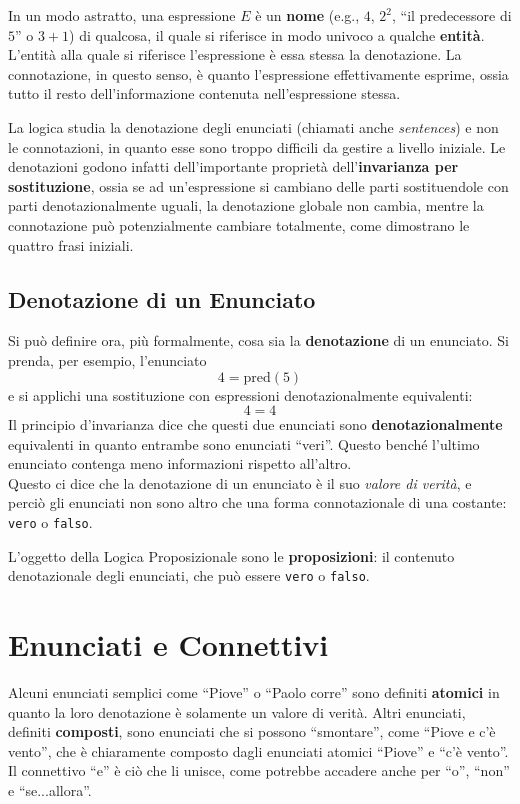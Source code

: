 In un modo astratto, una espressione $E$ è un \textbf{nome} (e.g., $4$, $2^2$, ``il predecessore di $5$'' o $3+1$) di qualcosa, il quale si riferisce in modo univoco a qualche \textbf{entità}. L'entità alla quale si riferisce l'espressione è essa stessa la denotazione. La connotazione, in questo senso, è quanto l'espressione effettivamente esprime, ossia tutto il resto dell'informazione contenuta nell'espressione stessa. 

La logica studia la denotazione degli enunciati (chiamati anche \textit{sentences}) e non le connotazioni, in quanto esse sono troppo difficili da gestire a livello iniziale. Le denotazioni godono infatti dell'importante proprietà dell'\textbf{invarianza per sostituzione}, ossia se ad un'espressione si cambiano delle parti sostituendole con parti denotazionalmente uguali, la denotazione globale non cambia, mentre la connotazione può potenzialmente cambiare totalmente, come dimostrano le quattro frasi iniziali.

\subsection{Denotazione di un Enunciato}
Si può definire ora, più formalmente, cosa sia la \textbf{denotazione} di 
un enunciato. Si prenda, per esempio, l'enunciato
$$
4 = \text{pred}(5)
$$
e si applichi una sostituzione con espressioni denotazionalmente equivalenti: 
$$
4 = 4
$$
Il principio d'invarianza dice che questi due enunciati sono \textbf{denotazionalmente}
equivalenti in quanto entrambe sono enunciati ``veri''. Questo benché l'ultimo enunciato contenga meno informazioni rispetto all'altro. \\
Questo ci dice che la denotazione di un enunciato è il suo \textit{valore di verità}, e perciò gli enunciati non sono altro che una forma connotazionale di una costante: \texttt{vero} o \texttt{falso}.

L'oggetto della Logica Proposizionale sono le \textbf{proposizioni}: il contenuto denotazionale degli enunciati, che può essere \texttt{vero} o \texttt{falso}. 

\section{Enunciati e Connettivi}
Alcuni enunciati semplici come ``Piove'' o ``Paolo corre'' sono definiti 
\textbf{atomici} in quanto la loro denotazione è solamente un valore di 
verità. Altri enunciati, definiti \textbf{composti}, sono enunciati che si possono
``smontare'', come ``Piove e c'è vento'', che è chiaramente composto 
dagli enunciati atomici ``Piove'' e ``c'è vento''. Il connettivo ``e'' è 
ciò che li unisce, come potrebbe accadere anche per ``o'', ``non'' 
e ``se...allora''. 

